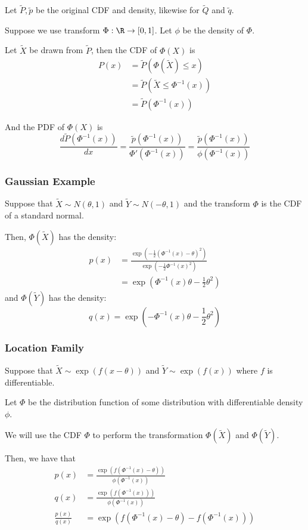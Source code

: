 \documentclass{article}
\begin{document}
Let $\tilde{P}, \tilde{p}$ be the original CDF and density, likewise for $\tilde{Q}$ and $\tilde{q}$. 

Suppose we use transform $\Phi : \R \rightarrow [0,1]$. Let $\phi$ be the density of $\Phi$. 

Let $\tilde{X}$ be drawn from $\tilde{P}$, then the CDF of $\Phi(X)$ is 
\begin{align*}
P(x) &= \tilde{P}( \Phi(\tilde{X}) \leq x) \\
   &= \tilde{P}( \tilde{X} \leq \Phi^{-1}(x)) \\
   &= \tilde{P}( \Phi^{-1}(x))
\end{align*}

And the PDF of $\Phi(X)$ is 
\[
\frac{ d \tilde{P}( \Phi^{-1}(x))}{dx}  = \frac{\tilde{p}(\Phi^{-1}(x))}{\Phi'(\Phi^{-1}(x))} 
= \frac{\tilde{p}(\Phi^{-1}(x))}{\phi(\Phi^{-1}(x))}
\]

\subsubsection{Gaussian Example}

Suppose that $\tilde{X} \sim N(\theta, 1)$ and $\tilde{Y} \sim N(-\theta, 1)$ and the transform $\Phi$ is the CDF of a standard normal.

Then, $\Phi(\tilde{X})$ has the density: 
\begin{align*}
p(x) &= \frac{\exp\left( - \frac{1}{2} (\Phi^{-1}(x) - \theta)^2 \right)}{\exp\left( - \frac{1}{2} \Phi^{-1}(x)^2 \right)} \\
   &= \exp\left( \Phi^{-1}(x) \theta - \frac{1}{2} \theta^2 \right)
\end{align*}
and $\Phi(\tilde{Y})$ has the density:
\[
q(x) = \exp \left( -\Phi^{-1}(x) \theta - \frac{1}{2} \theta^2 \right)
\]

\subsubsection{Location Family}

Suppose that $\tilde{X} \sim \exp( f(x - \theta))$ and $\tilde{Y} \sim \exp(f(x))$ where $f$ is differentiable. 

Let $\Phi$ be the distribution function of some distribution with differentiable density $\phi$.

We will use the CDF $\Phi$ to perform the transformation $\Phi(\tilde{X})$ and $\Phi(\tilde{Y})$. 

Then, we have that
\begin{align*}
p(x) &=  \frac{\exp\left( f(\Phi^{-1}(x) - \theta) \right)}{\phi(\Phi^{-1}(x))} \\
q(x) &=  \frac{\exp\left( f(\Phi^{-1}(x)) \right)}{\phi(\Phi^{-1}(x))} \\
\frac{p(x)}{q(x)} &=\exp\left( f(\Phi^{-1}(x) - \theta) - f(\Phi^{-1}(x)) \right) 
\end{align*}
\end{document}
